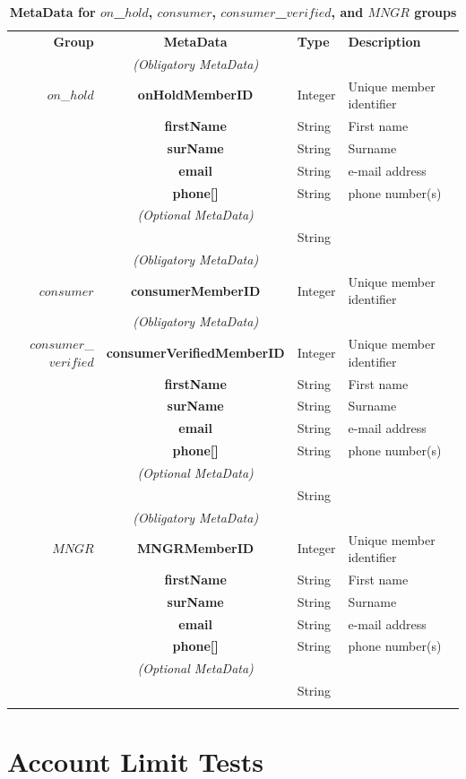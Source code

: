 \begin{table}[H]
\begin{centering}
\small
{
\begin{tabular}{ r | c | l | l }
\textbf{Group}	& {\bf MetaData} & {\bf Type} & {\bf Description} \\
\Xhline{1.5pt}
			& \emph{(Obligatory MetaData)} & & \\
\cline{2-2}
$on$\_$hold$	& {\bf onHoldMemberID}		&Integer & Unique member identifier \\
			& {\bf firstName}			&String & First name \\
			& {\bf surName}			&String & Surname \\
			& {\bf email}				&String & e-mail address \\
			& {\bf phone[]}				&String	& phone number(s) \\
\cline{2-2}
			 & \emph{(Optional MetaData)}& & \\
\cline{2-2}
			& {\bf }				&String &  \\
\Xhline{1.5pt}
			& \emph{(Obligatory MetaData)} & & \\
\cline{2-2}
$consumer$	& {\bf consumerMemberID}	&Integer & Unique member identifier \\
\Xhline{1.5pt}
			& \emph{(Obligatory MetaData)} & & \\
\cline{2-2}
$consumer$\_$verified$ & {\bf consumerVerifiedMemberID}	&Integer & Unique member identifier \\
			& {\bf firstName}			&String & First name \\
			& {\bf surName}			&String & Surname \\
			& {\bf email}				&String & e-mail address \\
			& {\bf phone[]}				&String	& phone number(s) \\
\cline{2-2}
			& \emph{(Optional MetaData)} & & \\
\cline{2-2}
			& {\bf }				&String &  \\
\Xhline{1.5pt}
			& \emph{(Obligatory MetaData)} & & \\
\cline{2-2}
$MNGR$ 		& {\bf MNGRMemberID}		&Integer & Unique member identifier \\
			& {\bf firstName}			&String & First name \\
			& {\bf surName}			&String & Surname \\
			& {\bf email}				&String & e-mail address \\
			& {\bf phone[]}				&String	& phone number(s) \\
\cline{2-2}
			 & \emph{(Optional MetaData)}& & \\
\cline{2-2}
			& {\bf }				&String &  \\
\Xhline{1.5pt}
\end{tabular}
}
\caption{\small\textbf{MetaData for $on$\_$hold$, $consumer$, $consumer$\_$verified$, and $MNGR$ groups}}
\label{tab:GroupMetaData}
\end{centering}
\end{table}






\section{Account Limit Tests}











